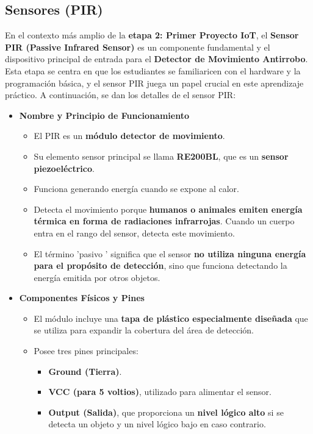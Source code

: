 \documentclass{report}
\begin{document}
\subsection{Sensores (PIR)}
En el contexto más amplio de la \textbf{etapa 2: Primer Proyecto IoT}, el \textbf{Sensor PIR (Passive Infrared Sensor)} es un componente fundamental y 
el dispositivo principal de entrada para el \textbf{Detector de Movimiento Antirrobo}. Esta etapa se centra en que los estudiantes se familiaricen con 
el hardware y la programación básica, y el sensor PIR juega un papel crucial en este aprendizaje práctico. A continuación, se dan los detalles de el sensor 
PIR:
\begin{itemize}
    \item \textbf{Nombre y Principio de Funcionamiento}
    \begin{itemize}
        \item El PIR es un \textbf{módulo detector de movimiento}.
        \item Su elemento sensor principal se llama \textbf{RE200BL}, que es un \textbf{sensor piezoeléctrico}.
        \item Funciona generando energía cuando se expone al calor.
        \item Detecta el movimiento porque \textbf{humanos o animales emiten energía térmica en forma de radiaciones infrarrojas}. Cuando un cuerpo entra 
        en el rango del sensor, detecta este movimiento.
        \item El término  'pasivo ' significa que el sensor \textbf{no utiliza ninguna energía para el propósito de detección}, sino que funciona detectando 
        la energía emitida por otros objetos.
    \end{itemize}

    \item \textbf{Componentes Físicos y Pines}
    \begin{itemize}
        \item El módulo incluye una \textbf{tapa de plástico especialmente diseñada} que se utiliza para expandir la cobertura del área de detección.
        \item Posee tres pines principales:
        \begin{itemize}
            \item \textbf{Ground (Tierra)}.
            \item \textbf{VCC (para 5 voltios)}, utilizado para alimentar el sensor.
            \item \textbf{Output (Salida)}, que proporciona un \textbf{nivel lógico alto} si se detecta un objeto y un nivel lógico bajo en caso contrario.
        \end{itemize}
    \end{itemize}


\end{itemize}
\end{document}
